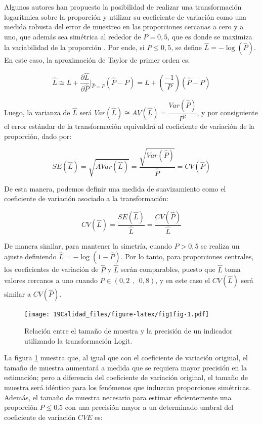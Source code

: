 \documentclass[
  12pt,
]{book}
\begin{document}
Algunos autores han propuesto la posibilidad de realizar una transformación logarítmica sobre la proporción y utilizar su coeficiente de variación como una medida robusta del error de muestreo en las proporciones cercanas a cero y a uno, que además sea simétrica al rededor de \(P=0,5\), que es donde se maximiza la variabilidad de la proporción \citep{Barnett_Walker_Chromy_Davis_Emrich_Odom_Packer_2003}. Por ende, si \(P\leq 0,5\), se define \(\hat L = -\log( \hat P)\). En este caso, la aproximación de Taylor de primer orden es:

\[
\hat{L} \cong L + \frac{\partial \hat{L}}{\partial \hat{P}}\biggr\rvert_{\hat{P}=P} (\hat{P}-P) = L + \left(\frac{-1}{P}\right)(\hat{P}-P)
\]

Luego, la varianza de \(\hat{L}\) será \(Var(\hat{L})\cong AV(\hat{L}) = \dfrac{Var(\hat{P})}{P^2}\), y por consiguiente el error estándar de la transformación equivaldrá al coeficiente de variación de la proporción, dado por:

\[
SE(\hat{L}) = \sqrt{AVar(\hat{L})} = \dfrac{\sqrt{Var(\hat{P})}}{\hat{P}} = CV(\hat{P}) 
\]

De esta manera, podemos definir una medida de suavizamiento como el coeficiente de variación asociado a la transformación:

\[
CV(\hat{L}) = \dfrac{SE(\hat{L})}{\hat{L}} = \dfrac{CV(\hat{P})}{\hat{L}}
\]

De manera similar, para mantener la simetría, cuando \(P>0,5\) se realiza un ajuste definiendo \(\hat{L} = -\log(1-\hat{P})\). Por lo tanto, para proporciones centrales, los coeficientes de variación de \(\hat{P}\) y \(\hat{L}\) serán comparables, puesto que \(\hat{L}\) toma valores cercanos a uno cuando \(P \in (0,2\ \ ,\ \ 0,8)\), y en este caso el \(CV(\hat{L})\) será similar a \(CV(\hat{P})\).

\begin{figure}
\centering
\texttt{[image: 19Calidad\_files/figure-latex/fig1fig-1.pdf]}
\caption{\label{fig:fig1fig}Relación entre el tamaño de muestra y la precisión de un indicador utilizando la transformación Logit.}
\end{figure}

La figura \ref{fig:fig1fig} muestra que, al igual que con el coeficiente de variación original, el tamaño de muestra aumentará a medida que se requiera mayor precisión en la estimación; pero a diferencia del coeficiente de variación original, el tamaño de muestra será idéntico para los fenómenos que induzcan proporciones simétricas. Además, el tamaño de muestra necesario para estimar eficientemente una proporción \(P\leq 0.5\) con una precisión mayor a un determinado umbral del coeficiente de variación \(CVE\) es:
\end{document}
